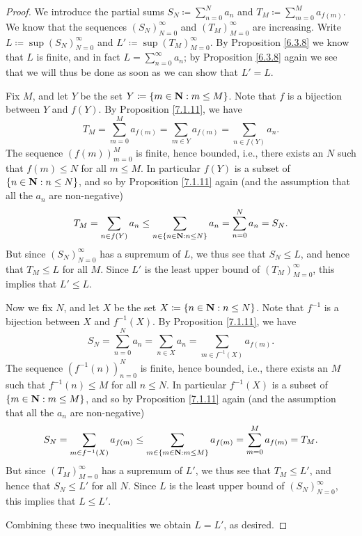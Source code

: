 \begin{proof}
    We introduce the partial sums \(S_N \coloneqq \sum_{n = 0}^N a_n\) and \(T_M \coloneqq \sum_{m = 0}^M a_{f(m)}\).
    We know that the sequences \((S_N)_{N = 0}^\infty\) and \((T_M)_{M = 0}^\infty\) are increasing.
    Write \(L \coloneqq \sup(S_N)_{N = 0}^\infty\) and \(L' \coloneqq \sup(T_M)_{M = 0}^\infty\).
    By Proposition \ref{6.3.8} we know that \(L\) is finite, and in fact \(L = \sum_{n = 0}^\infty a_n\);
    by Proposition \ref{6.3.8} again we see that we will thus be done as soon as we can show that \(L' = L\).

    Fix \(M\), and let \(Y\) be the set \(Y \coloneqq \{m \in \mathbf{N} : m \leq M\}\).
    Note that \(f\) is a bijection between \(Y\) and \(f(Y)\).
    By Proposition \ref{7.1.11}, we have
    \[
        T_M = \sum_{m = 0}^M a_{f(m)} = \sum_{m \in Y} a_{f(m)} = \sum_{n \in f(Y)} a_n.
    \]
    The sequence \((f(m))_{m = 0}^M\) is finite, hence bounded, i.e., there exists an \(N\) such that \(f(m) \leq N\) for all \(m \leq M\).
    In particular \(f(Y)\) is a subset of \(\{n \in \mathbf{N} : n \leq N\}\), and so by Proposition \ref{7.1.11} again (and the assumption that all the \(a_n\) are non-negative)
    \[
        T_M = \sum_{n \in f(Y)} a_n \leq \sum_{n \in \{n \in \mathbf{N} : n \leq N\}} a_n = \sum_{n = 0}^N a_n = S_N.
    \]
    But since \((S_N)_{N = 0}^\infty\) has a supremum of \(L\), we thus see that \(S_N \leq L\), and hence that \(T_M \leq L\) for all \(M\).
    Since \(L'\) is the least upper bound of \((T_M)_{M = 0}^\infty\), this implies that \(L' \leq L\).

    Now we fix \(N\), and let \(X\) be the set \(X \coloneqq \{n \in \mathbf{N} : n \leq N\}\).
    Note that \(f^{-1}\) is a bijection between \(X\) and \(f^{-1}(X)\).
    By Proposition \ref{7.1.11}, we have
    \[
        S_N = \sum_{n = 0}^N a_n = \sum_{n \in X} a_n = \sum_{m \in f^{-1}(X)} a_{f(m)}.
    \]
    The sequence \((f^{-1}(n))_{n = 0}^N\) is finite, hence bounded, i.e., there exists an \(M\) such that \(f^{-1}(n) \leq M\) for all \(n \leq N\).
    In particular \(f^{-1}(X)\) is a subset of \(\{m \in \mathbf{N} : m \leq M\}\), and so by Proposition \ref{7.1.11} again (and the assumption that all the \(a_n\) are non-negative)
    \[
        S_N = \sum_{m \in f^{-1}(X)} a_{f(m)} \leq \sum_{m \in \{m \in \mathbf{N} : m \leq M\}} a_{f(m)} = \sum_{m = 0}^M a_{f(m)} = T_M.
    \]
    But since \((T_M)_{M = 0}^\infty\) has a supremum of \(L'\), we thus see that \(T_M \leq L'\), and hence that \(S_N \leq L'\) for all \(N\).
    Since \(L\) is the least upper bound of \((S_N)_{N = 0}^\infty\), this implies that \(L \leq L'\).

    Combining these two inequalities we obtain \(L = L'\), as desired.
\end{proof}

